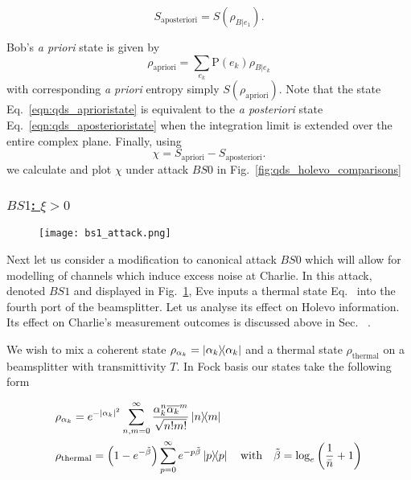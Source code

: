 \begin{equation}\label{eqn:aposteriori_entropy}
S_{\text{aposteriori}} = S\left(\rho_{B | e_1}\right).
\end{equation}

Bob's \emph{a priori} state is given by
\begin{equation}\label{eqn:qds_aprioristate}
\rho_{\text{apriori}} = \sum_{e_k} \text{P}\left(e_k\right) \rho_{B|e_k}
\end{equation}
with corresponding \emph{a priori} entropy simply $S\left(\rho_{\text{apriori}}\right)$. Note that the state Eq.~\ref{eqn:qds_aprioristate} is equivalent to the \emph{a posteriori} state Eq.~\ref{eqn:qds_aposterioristate} when the integration limit is extended over the entire complex plane. Finally, using
\begin{equation}
\chi = S_{\text{apriori}} - S_{\text{aposteriori}}.
\end{equation}
we calculate and plot $\chi$ under attack $BS0$ in Fig.~\ref{fig:qds_holevo_comparisons}

\subsubsection{\underline{$BS1$: $\xi > 0$}}
\begin{figure}[htp]
\centering
\texttt{[image: bs1\_attack.png]}
\caption{\label{fig:bs1_attack}}
\end{figure}
Next let us consider a modification to canonical attack $BS0$ which will allow for modelling of channels which induce excess noise at Charlie. In this attack, denoted $BS1$ and displayed in Fig.~\ref{fig:bs1_attack}, Eve inputs a thermal state Eq.~ into the fourth port of the beamsplitter. Let us analyse its effect on Holevo information. Its effect on Charlie's measurement outcomes is discussed above in Sec.~ .

We wish to mix a coherent state $\rho_{\alpha_k} = \dyad{\alpha_k}$ and a thermal state $\rho_{\text{thermal}}$ on a beamsplitter with transmittivity $T$. In Fock basis our states take the following form

\begin{align}
&\rho_{\alpha_k} = e^{-\left|\alpha_k\right|^2} \sum_{n, m=0}^{\infty} \frac{\alpha_k^n \overline{\alpha_k}^{m}}{\sqrt{n! m!}} \dyad{n}{m} \notag \\
&\rho_{\text{thermal}} = \left(1 - e^{-\tilde{\beta}}\right) \sum_{p=0}^\infty e^{- p \tilde{\beta}}\dyad{p} \qq{with} \tilde{\beta} = \log_e\left(\frac{1}{\bar{n}} +1\right)
\end{align}

